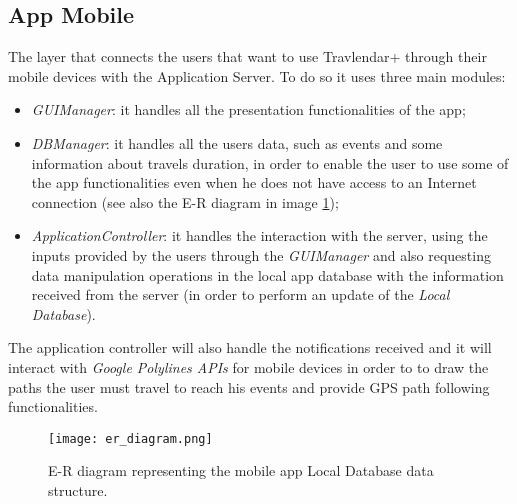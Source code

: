 \subsection{App Mobile}
\label{subsect:App Mobile}
	The layer that connects the users that want to use Travlendar+ through their mobile devices with the Application Server.
	To do so it uses three main modules: 
	\begin{itemize}
	\item \textit{GUIManager}: it handles all the presentation functionalities of the app;
	\item \textit{DBManager}: it handles all the users data, such as events and some information about travels duration, in order to enable the user to use some of the app functionalities even when he does not have access to an Internet connection (see also the E-R diagram in image \ref{fig:localDB});
	\item \textit{ApplicationController}: it handles the interaction with the server, using the inputs provided by the users through the \textit{GUIManager} and also requesting data manipulation operations in the local app database with the information received from the server (in order to perform an update of the \textit{Local Database}).
	\end{itemize}
	The application controller will also handle the notifications received and it will interact with \textit{Google Polylines APIs} for mobile devices in order to to draw the paths the user must travel to reach his events and provide GPS path following functionalities.
\begin{figure} [H]
	\begin{center}
		\hspace*{-10pt}
		\texttt{[image: er\_diagram.png]}
	\end{center}
	\caption{E-R diagram representing the mobile app Local Database data structure.}
	\label{fig:localDB}
\end{figure}
\newpage